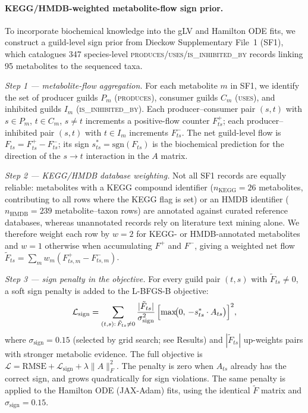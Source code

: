 \documentclass[11pt,a4paper]{article}
\begin{document}
\paragraph{KEGG/HMDB-weighted metabolite-flow sign prior.}
\label{sec:kegg_prior}
To incorporate biochemical knowledge into the gLV and Hamilton ODE fits, we construct a guild-level sign prior from Dieckow Supplementary File~1 (SF1), which catalogues 347 species-level \textsc{produces}/\textsc{uses}/\textsc{is\_inhibited\_by} records linking 95 metabolites to the sequenced taxa.

\textit{Step 1 --- metabolite-flow aggregation.}
For each metabolite $m$ in SF1, we identify the set of producer guilds $P_m$ (\textsc{produces}), consumer guilds $C_m$ (\textsc{uses}), and inhibited guilds $I_m$ (\textsc{is\_inhibited\_by}).
Each producer--consumer pair $(s,t)$ with $s\in P_m$, $t\in C_m$, $s\neq t$ increments a positive-flow counter $F^+_{ts}$; each producer--inhibited pair $(s,t)$ with $t\in I_m$ increments $F^-_{ts}$.
The net guild-level flow is $F_{ts}=F^+_{ts}-F^-_{ts}$; its sign $s^*_{ts}=\mathrm{sgn}(F_{ts})$ is the biochemical prediction for the direction of the $s\to t$ interaction in the $A$ matrix.

\textit{Step 2 --- KEGG/HMDB database weighting.}
Not all SF1 records are equally reliable: metabolites with a KEGG compound identifier ($n_{\mathrm{KEGG}}=26$ metabolites, contributing to all rows where the KEGG flag is set) or an HMDB identifier ($n_{\mathrm{HMDB}}=239$ metabolite--taxon rows) are annotated against curated reference databases, whereas unannotated records rely on literature text mining alone.
We therefore weight each row by $w=2$ for KEGG- or HMDB-annotated metabolites and $w=1$ otherwise when accumulating $F^+$ and $F^-$, giving a weighted net flow $\tilde{F}_{ts}=\sum_m w_m(F^+_{ts,m}-F^-_{ts,m})$.

\textit{Step 3 --- sign penalty in the objective.}
For every guild pair $(t,s)$ with $\tilde{F}_{ts}\neq0$, a soft sign penalty is added to the L-BFGS-B objective:
\begin{equation}
\mathcal{L}_{\mathrm{sign}} = \sum_{(t,s):\,\tilde{F}_{ts}\neq0}
  \frac{|\tilde{F}_{ts}|}{\sigma_{\mathrm{sign}}^2}\,
  \Bigl[\max\!\bigl(0,\,-s^*_{ts}\cdot A_{ts}\bigr)\Bigr]^2,
\label{eq:sign_penalty}
\end{equation}
where $\sigma_{\mathrm{sign}}=0.15$ (selected by grid search; see Results) and $|\tilde{F}_{ts}|$ up-weights pairs with stronger metabolic evidence.
The full objective is $\mathcal{L}=\mathrm{RMSE}+\mathcal{L}_{\mathrm{sign}}+\lambda\|A\|_F^2$.
The penalty is zero when $A_{ts}$ already has the correct sign, and grows quadratically for sign violations.
The same penalty is applied to the Hamilton ODE (JAX-Adam) fits, using the identical $\tilde{F}$ matrix and $\sigma_{\mathrm{sign}}=0.15$.
\end{document}
